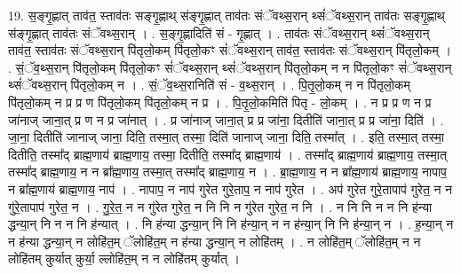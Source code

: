\documentclass[17pt]{extarticle}
\begin{document}
19. स॒ङ्गृ॒ह्णात् ताव॑त॒ स्ताव॑तः सङ्गृ॒ह्णाथ् स॑ङ्गृ॒ह्णात् ताव॑तः संॅवथ्स॒रान् थ्सं॑ॅवथ्स॒रान् ताव॑तः सङ्गृ॒ह्णाथ् स॑ङ्गृ॒ह्णात् ताव॑तः संॅवथ्स॒रान् । . स॒ङ्गृ॒ह्णादिति॑ सं - गृ॒ह्णात् । . ताव॑तः संॅवथ्स॒रान् थ्सं॑ॅवथ्स॒रान् ताव॑त॒ स्ताव॑तः संॅवथ्स॒रान् पि॑तृलो॒कम् पि॑तृलो॒कꣳ सं॑ॅवथ्स॒रान् ताव॑त॒ स्ताव॑तः संॅवथ्स॒रान् पि॑तृलो॒कम् । . सं॒ॅव॒थ्स॒रान् पि॑तृलो॒कम् पि॑तृलो॒कꣳ सं॑ॅवथ्स॒रान् थ्सं॑ॅवथ्स॒रान् पि॑तृलो॒कम् न न पि॑तृलो॒कꣳ सं॑ॅवथ्स॒रान् थ्सं॑ॅवथ्स॒रान् पि॑तृलो॒कम् न । . सं॒ॅव॒थ्स॒रानिति॑ सं - व॒थ्स॒रान् । . पि॒तृ॒लो॒कम् न न पि॑तृलो॒कम् पि॑तृलो॒कम् न प्र प्र ण पि॑तृलो॒कम् पि॑तृलो॒कम् न प्र । . पि॒तृ॒लो॒कमिति॑ पितृ - लो॒कम् । . न प्र प्र ण न प्र जा॑नाज् जाना॒त् प्र ण न प्र जा॑नात् । . प्र जा॑नाज् जाना॒त् प्र प्र जा॑ना॒ दितीति॑ जाना॒त् प्र प्र जा॑ना॒ दिति॑ । . जा॒ना॒ दितीति॑ जानाज् जाना॒ दिति॒ तस्मा॒त् तस्मा॒ दिति॑ जानाज् जाना॒ दिति॒ तस्मा᳚त् । . इति॒ तस्मा॒त् तस्मा॒ दितीति॒ तस्मा᳚द् ब्राह्म॒णाय॑ ब्राह्म॒णाय॒ तस्मा॒ दितीति॒ तस्मा᳚द् ब्राह्म॒णाय॑ । . तस्मा᳚द् ब्राह्म॒णाय॑ ब्राह्म॒णाय॒ तस्मा॒त् तस्मा᳚द् ब्राह्म॒णाय॒ न न ब्रा᳚ह्म॒णाय॒ तस्मा॒त् तस्मा᳚द् ब्राह्म॒णाय॒ न । . ब्रा॒ह्म॒णाय॒ न न ब्रा᳚ह्म॒णाय॑ ब्राह्म॒णाय॒ नापाप॒ न ब्रा᳚ह्म॒णाय॑ ब्राह्म॒णाय॒ नाप॑ । . नापाप॒ न नाप॑ गुरेत गुरे॒ताप॒ न नाप॑ गुरेत । . अप॑ गुरेत गुरे॒तापाप॑ गुरेत॒ न न गु॑रे॒तापाप॑ गुरेत॒ न । . गु॒रे॒त॒ न न गु॑रेत गुरेत॒ न नि नि न गु॑रेत गुरेत॒ न नि । . न नि नि न न नि ह॑न्या द्धन्या॒न् नि न न नि ह॑न्यात् । . नि ह॑न्या द्धन्या॒न् नि नि ह॑न्या॒न् न न ह॑न्या॒न् नि नि ह॑न्या॒न् न । . ह॒न्या॒न् न न ह॑न्या द्धन्या॒न् न लोहि॑त॒म् ॅलोहि॑त॒म् न ह॑न्या द्धन्या॒न् न लोहि॑तम् । . न लोहि॑त॒म् ॅलोहि॑त॒म् न न लोहि॑तम् कुर्यात् कुर्या॒ ल्लोहि॑त॒म् न न लोहि॑तम् कुर्यात् । \newline
\end{document}
